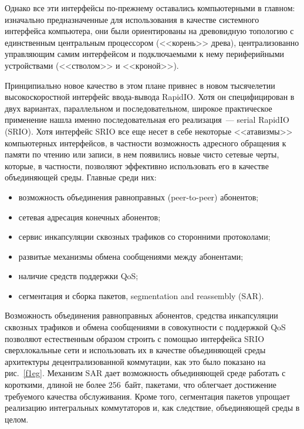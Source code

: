 \begin{multicols}{2}
Однако все эти интерфейсы по-прежнему оставались компьютерными в главном: 
изначально предназначенные для использования в качестве сис\-тем\-но\-го интерфейса 
компьютера, они были ориентированы на древовидную топологию с единственным 
центральным процессором (<<корень>> древа), централизованно управляющим самим 
интерфейсом и под\-клю\-ча\-емы\-ми к нему периферийными устройствами (<<стволом>> и 
<<кроной>>).
     
     Принципиально новое качество в этом плане привнес в новом тысячелетии 
высокоскоростной интерфейс ввода-вывода RapidIO. Хотя он специфицирован в двух 
вариантах, параллельном и\linebreak
 последовательном, широкое практическое применение нашла 
именно последовательная его реализация~--- serial RapidIO (SRIO). Хотя интерфейс SRIO 
все еще несет в себе некоторые <<атавизмы>> компьютерных интерфейсов, в частности 
возможность адресного обращения к памяти по чтению или записи, в нем появились новые 
чисто сетевые черты, которые, в частности, позволяют эффективно использовать его в 
качестве объединяющей среды. Главные среди них:
     \begin{itemize}
\item возможность объединения равноправных (peer-to-peer) абонентов;
\item сетевая адресация конечных абонентов;
\item сервис инкапсуляции сквозных трафиков со сторонними протоколами;
\item развитые механизмы обмена сообщениями между абонентами;
\item наличие средств поддержки QoS;
\item сегментация и сборка пакетов, segmentation and reassembly (SAR).
\end{itemize}

     Возможность объединения равноправных абонентов, средства инкапсуляции сквозных 
трафиков и обмена сообщениями в совокупности с поддержкой QoS позволяют 
естественным образом строить с помощью интерфейса SRIO сверхлокальные сети и 
использовать их в качестве объединяющей среды архитектуры децентрализованной 
коммутации, как это было показано на рис.~\ref{f1eg}. Механизм SAR дает возможность 
объединяющей среде работать с короткими, длиной не более 256~байт, пакетами, что 
облегчает достижение требуемого качества обслуживания. Кроме того, сегментация пакетов 
упрощает реализацию интегральных коммутаторов и, как следствие, объединяющей среды в 
целом.
     

\end{multicols}
